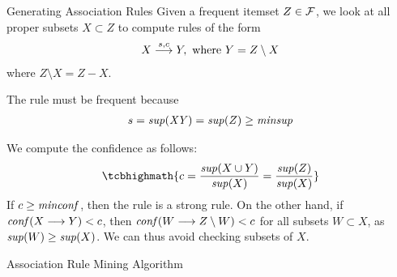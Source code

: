 \begin{frame}{Generating Association Rules}
Given a frequent itemset $Z \in {\mathcal F}$,
we look at all proper subsets
$X\subset Z$ to compute rules of the form
\begin{align*}
  X \arule{s,c} Y, \text{ where } Y = Z\setminus X
\end{align*}
where $Z \setminus X  = Z - X$.

\medskip
The rule must be frequent
because
\begin{align*}
s = \mathit{sup}(\mathit{XY}) = \mathit{sup}(Z) \geq \mathit{minsup}
\end{align*}

\medskip
We compute the conf\/{i}dence as follows:
\begin{align*}
\tcbhighmath{
c = \frac{\supp(X \cup Y)}{\supp(X)} = \frac{\supp(Z)}{\supp(X)}
}
\end{align*}
If $c \geq \mathit{minconf}$, then the rule is a strong rule. On the other
hand, if $\conff(X\arule Y) < c$, then
$\conff(W \arule Z \setminus W) < c$ for all subsets $W \subset X$,
as $\mathit{sup}(W) \ge \mathit{sup}(X)$. We can thus
avoid checking subsets of $X$.
\end{frame}


\begin{frame}[fragile]{Association Rule Mining Algorithm}
\begin{tightalgo}[H]{\textwidth-18pt}
\AlgoRuleMining{}
\end{tightalgo}
\end{frame}
